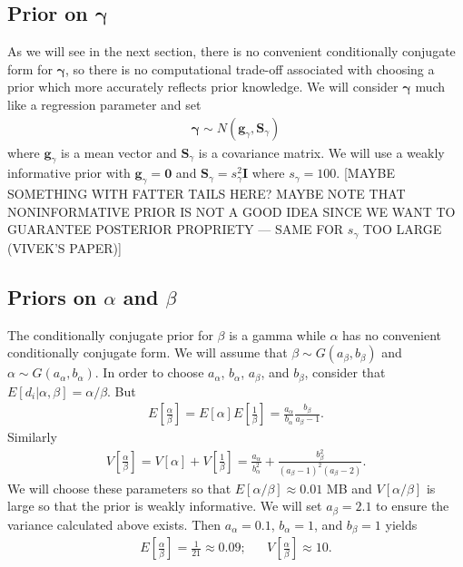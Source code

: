\documentclass{article}
\begin{document}
\subsection{Prior on $\bm{\gamma}$}
As we will see in the next section, there is no convenient conditionally conjugate form for $\bm{\gamma}$, so there is no computational trade-off associated with choosing a prior which more accurately reflects prior knowledge. We will consider $\bm{\gamma}$ much like a regression parameter and set
\begin{align*}
\bm{\gamma} \sim N(\bm{g}_\gamma, \bm{S}_\gamma)
\end{align*}
where $\bm{g}_\gamma$ is a mean vector and $\bm{S}_\gamma$ is a covariance matrix. We will use a weakly informative prior with $\bm{g}_\gamma = \bm{0}$ and $\bm{S}_\gamma = s^2_\gamma\bm{I}$ where $s_\gamma = 100$.  [MAYBE SOMETHING WITH FATTER TAILS HERE? MAYBE NOTE THAT NONINFORMATIVE PRIOR IS NOT A GOOD IDEA SINCE WE WANT TO GUARANTEE POSTERIOR PROPRIETY --- SAME FOR $s_\gamma$ TOO LARGE (VIVEK'S PAPER)]

\subsection{Priors on $\alpha$ and $\beta$}
The conditionally conjugate prior for $\beta$ is a gamma while $\alpha$ has no convenient conditionally conjugate form. We will assume that $\beta \sim G(a_\beta, b_\beta)$ and $\alpha \sim G(a_\alpha, b_\alpha)$. In order to choose $a_\alpha$, $b_\alpha$, $a_\beta$, and $b_\beta$, consider that $E[d_i|\alpha,\beta] = \alpha/\beta$. But 
\begin{align*}
E\left[\frac{\alpha}{\beta}\right] = E[\alpha]E\left[\frac{1}{\beta}\right] = \frac{a_\alpha}{b_\alpha}\frac{b_\beta}{a_\beta - 1}.
\end{align*}
Similarly
\begin{align*}
V\left[\frac{\alpha}{\beta}\right] = V[\alpha] + V\left[\frac{1}{\beta}\right] = \frac{a_\alpha}{b_\alpha^2} + \frac{b_\beta^2}{(a_\beta - 1)^2(a_\beta - 2)}.
\end{align*}
We will choose these parameters so that $E[\alpha/\beta] \approx 0.01$ MB and $V[\alpha/\beta]$ is large so that the prior is weakly informative. We will set $a_\beta = 2.1$ to ensure the variance calculated above exists. Then $a_\alpha = 0.1$, $b_\alpha = 1$, and $b_\beta = 1$ yields
\begin{align*}
E\left[\frac{\alpha}{\beta}\right] = \frac{1}{21} \approx 0.09; && V\left[\frac{\alpha}{\beta}\right] \approx 10.
\end{align*}
\end{document}
